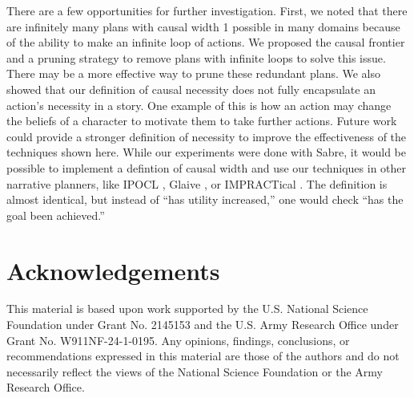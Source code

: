 \documentclass[letterpaper]{article} %
\begin{document}
There are a few opportunities for further investigation. First, we noted that there are infinitely many plans with causal width 1 possible in many domains because of the ability to make an infinite loop of actions. We proposed the causal frontier and a pruning strategy to remove plans with infinite loops to solve this issue. There may be a more effective way to prune these redundant plans. We also showed that our definition of causal necessity does not fully encapsulate an action's necessity in a story. One example of this is how an action may change the beliefs of a character to motivate them to take further actions. Future work could provide a stronger definition of necessity to improve the effectiveness of the techniques shown here. While our experiments were done with Sabre, it would be possible to implement a defintion of causal width and use our techniques in other narrative planners, like IPOCL \cite{riedl2010narrative}, Glaive \cite{ware2014glaive}, or IMPRACTical \cite{teutenberg2013efficient}. The definition is almost identical, but instead of ``has utility increased,” one would check ``has the goal been achieved.”

\section{Acknowledgements}

This material is based upon work supported by the U.S. National Science Foundation under Grant No. 2145153 and the U.S. Army Research Office under Grant No. W911NF-24-1-0195. Any opinions, findings, conclusions, or recommendations expressed in this material are those of the authors and do not necessarily reflect the views of the National Science Foundation or the Army Research Office.




\end{document}
